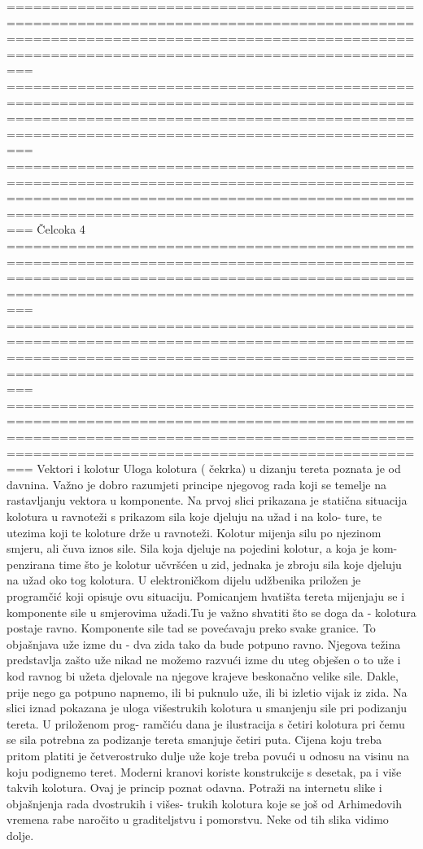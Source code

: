 ===========================================================================================================================================================================================
===========================================================================================================================================================================================
===========================================================================================================================================================================================
Čelcoka 4
===========================================================================================================================================================================================
===========================================================================================================================================================================================
===========================================================================================================================================================================================
Vektori i kolotur
Uloga kolotura ( čekrka) u dizanju tereta poznata je od davnina. Važno je dobro razumjeti principe njegovog rada koji se temelje na rastavljanju vektora u komponente.
Na prvoj slici prikazana je statična situacija kolotura u ravnoteži s prikazom sila koje djeluju na užad i na kolo- ture, te utezima koji te koloture drže u ravnoteži. Kolotur mijenja silu po njezinom smjeru, ali čuva iznos sile. Sila koja djeluje na pojedini kolotur, a koja je kom- penzirana time što je kolotur učvršćen u zid, jednaka je zbroju sila koje djeluju na užad oko tog kolotura. U elektroničkom dijelu udžbenika priložen je programčić koji opisuje ovu situaciju. Pomicanjem hvatišta tereta mijenjaju se i komponente sile u smjerovima užadi.Tu je važno shvatiti što se doga da - kolotura postaje ravno. Komponente sile tad se povećavaju preko svake granice. To objašnjava uže izme du - dva zida tako da bude potpuno ravno. Njegova težina predstavlja zašto uže nikad ne možemo razvući izme du uteg obješen o to uže i kod ravnog bi užeta djelovale na njegove krajeve beskonačno velike sile. Dakle, prije nego ga potpuno napnemo, ili bi puknulo uže, ili bi izletio vijak iz zida. Na slici iznad pokazana je uloga višestrukih kolotura u smanjenju sile pri podizanju tereta. U priloženom prog- ramčiću dana je ilustracija s četiri kolotura pri čemu se sila potrebna za podizanje tereta smanjuje četiri puta. Cijena koju treba pritom platiti je četverostruko dulje uže koje treba povući u odnosu na visinu na koju podignemo teret. Moderni kranovi koriste konstrukcije s desetak, pa i više takvih kolotura. Ovaj je princip poznat odavna. Potraži na internetu slike i objašnjenja rada dvostrukih i višes- trukih kolotura koje se još od Arhimedovih vremena rabe naročito u graditeljstvu i pomorstvu. Neke od tih slika vidimo dolje.

